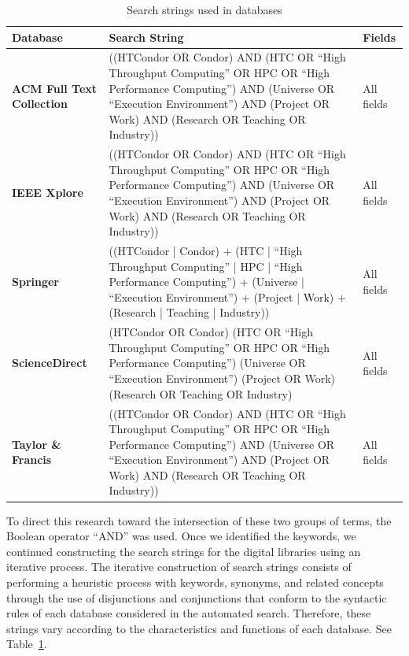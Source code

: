 \begin{table}[htbp]
	\centering
	\caption{Search strings used in databases}
	\label{table:cadenas_de_busqueda}
	\renewcommand{\arraystretch}{1}  %
	\begin{tabular}{p{3.2cm}p{11cm}p{2.5cm}}
		\toprule
		\textbf{Database}                 & \textbf{Search String}                                                                                                                                                                                              & \textbf{Fields} \\
		\midrule
		\textbf{ACM Full Text Collection} & ((HTCondor OR Condor) AND (HTC OR ``High Throughput Computing'' OR HPC OR ``High Performance Computing'') AND (Universe OR ``Execution Environment'') AND (Project OR Work) AND (Research OR Teaching OR Industry)) & All fields      \\
		\addlinespace[0.8em]
		\textbf{IEEE Xplore}              & ((HTCondor OR Condor) AND (HTC OR ``High Throughput Computing'' OR HPC OR ``High Performance Computing'') AND (Universe OR ``Execution Environment'') AND (Project OR Work) AND (Research OR Teaching OR Industry)) & All fields      \\
		\addlinespace[0.8em]
		\textbf{Springer}                 & ((HTCondor | Condor) + (HTC | ``High Throughput Computing'' | HPC | ``High Performance Computing'') + (Universe | ``Execution Environment'') + (Project | Work) + (Research | Teaching | Industry))                 & All fields      \\
		\addlinespace[0.8em]
		\textbf{ScienceDirect}            & (HTCondor OR Condor) (HTC OR ``High Throughput Computing'' OR HPC OR ``High Performance Computing'') (Universe OR ``Execution Environment'') (Project OR Work) (Research OR Teaching OR Industry)                   & All fields      \\
		\addlinespace[0.8em]
		\textbf{Taylor \& Francis}        & ((HTCondor OR Condor) AND (HTC OR ``High Throughput Computing'' OR HPC OR ``High Performance Computing'') AND (Universe OR ``Execution Environment'') AND (Project OR Work) AND (Research OR Teaching OR Industry)) & All fields      \\
		\bottomrule
	\end{tabular}
\end{table}


To direct this research toward the intersection of these two groups of terms, the Boolean operator ``AND'' was used. Once we identified the keywords, we continued constructing the search strings for the digital libraries using an iterative process. The iterative construction of search strings consists of performing a heuristic process with keywords, synonyms, and related concepts through the use of disjunctions and conjunctions that conform to the syntactic rules of each database considered in the automated search. Therefore, these strings vary according to the characteristics and functions of each database. See Table~\ref{table:cadenas_de_busqueda}.


